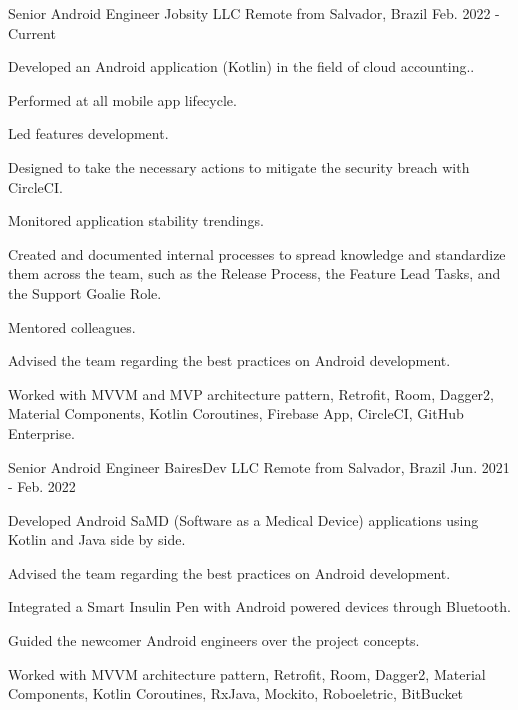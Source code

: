 

\begin{cventries}

  \cventry
    {Senior Android Engineer} %
    {Jobsity LLC} %
    {Remote from Salvador, Brazil} %
    {Feb. 2022 - Current} %
    {
      \begin{cvitems} %
        \item {Developed an Android application (Kotlin) in the field of cloud accounting..}
        \item {Performed at all mobile app lifecycle.}
        \item {Led features development.}
        \item {Designed to take the necessary actions to mitigate the security breach with CircleCI.}
        \item {Monitored application stability trendings.}
        \item {Created and documented internal processes to spread knowledge and standardize them across the team, such as the Release Process, the Feature Lead Tasks, and the Support Goalie Role.}
        \item {Mentored colleagues.}
        \item {Advised the team regarding the best practices on Android development.}
        \item {Worked with MVVM and MVP architecture pattern, Retrofit, Room, Dagger2, Material Components, Kotlin Coroutines, Firebase App, CircleCI, GitHub Enterprise.}
      \end{cvitems}
    }

  \cventry
    {Senior Android Engineer} %
    {BairesDev LLC} %
    {Remote from Salvador, Brazil} %
    {Jun. 2021 - Feb. 2022} %
    {
      \begin{cvitems} %
        \item {Developed Android SaMD (Software as a Medical Device) applications using Kotlin and Java side by side.}
        \item {Advised the team regarding the best practices on Android development.}
        \item {Integrated a Smart Insulin Pen with Android powered devices through Bluetooth.}
        \item {Guided the newcomer Android engineers over the project concepts.}
        \item {Worked with MVVM architecture pattern, Retrofit, Room, Dagger2, Material Components, Kotlin Coroutines, RxJava, Mockito, Roboeletric, BitBucket}
      \end{cvitems}
    }


\end{cventries}
